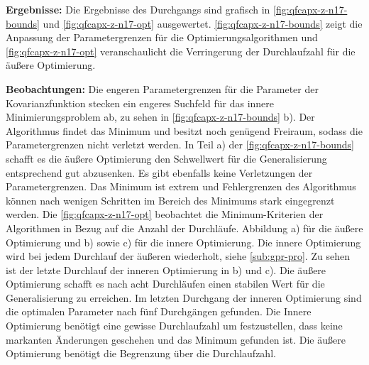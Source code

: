 \clearpage


\textbf{Ergebnisse:} Die Ergebnisse des Durchgangs sind grafisch in \autoref{fig:qfcapx-z-n17-bounds} und \autoref{fig:qfcapx-z-n17-opt} ausgewertet. \autoref{fig:qfcapx-z-n17-bounds} zeigt die Anpassung der Parametergrenzen für die Optimierungsalgorithmen und \autoref{fig:qfcapx-z-n17-opt} veranschaulicht die Verringerung der Durchlaufzahl für die äußere Optimierung.



\textbf{Beobachtungen:} Die engeren Parametergrenzen für die Parameter der Kovarianzfunktion stecken ein engeres Suchfeld für das innere Minimierungsproblem ab, zu sehen in \autoref{fig:qfcapx-z-n17-bounds} b). Der Algorithmus findet das Minimum und besitzt noch genügend Freiraum, sodass die Parametergrenzen nicht verletzt werden. In Teil a) der \autoref{fig:qfcapx-z-n17-bounds} schafft es die äußere Optimierung den Schwellwert für die Generalisierung entsprechend gut abzusenken. Es gibt ebenfalls keine Verletzungen der Parametergrenzen. Das Minimum ist extrem und Fehlergrenzen des Algorithmus können nach wenigen Schritten im Bereich des Minimums stark eingegrenzt werden. Die \autoref{fig:qfcapx-z-n17-opt} beobachtet die Minimum-Kriterien der Algorithmen in Bezug auf die Anzahl der Durchläufe. Abbildung a) für die äußere Optimierung und b) sowie c) für die innere Optimierung. Die innere Optimierung wird bei jedem Durchlauf der äußeren wiederholt, siehe \autoref{sub:gpr-pro}. Zu sehen ist der letzte Durchlauf der inneren Optimierung in b) und c). Die äußere Optimierung schafft es nach acht Durchläufen einen stabilen Wert für die Generalisierung zu erreichen. Im letzten Durchgang der inneren Optimierung sind die optimalen Parameter nach fünf Durchgängen gefunden. Die Innere Optimierung benötigt eine gewisse Durchlaufzahl um festzustellen, dass keine markanten Änderungen geschehen und das Minimum gefunden ist. Die äußere Optimierung benötigt die Begrenzung über die Durchlaufzahl.


